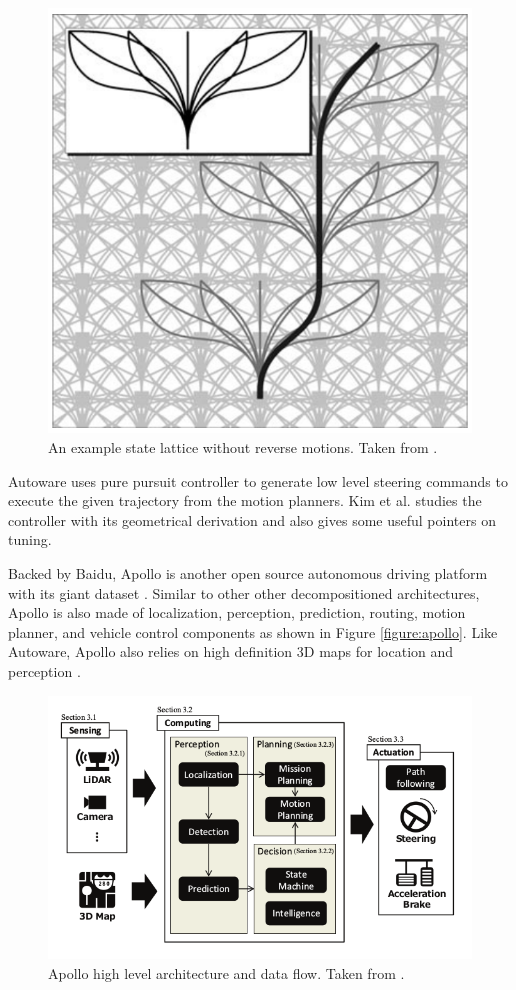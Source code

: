 \begin{figure}[h]
\centering
\includegraphics[width=.8\textwidth]{figures/state-lattice.png}
\caption{An example state lattice without reverse motions. Taken from
\cite{Pivtoraiko2009DifferentiallyCM}.}
\label{figure:state-lattice}
\end{figure}

Autoware uses pure pursuit controller to generate low level steering commands
to execute the given trajectory from the motion planners. Kim et al.
\cite{cite18} studies the controller with its geometrical derivation and also
gives some useful pointers on tuning.

Backed by Baidu, Apollo is another open source autonomous driving platform with
its giant dataset \cite{Huang2018TheAD}. Similar to other other decompositioned
architectures, Apollo is also made of localization, perception, prediction,
routing, motion planner, and vehicle control components as shown in Figure
\ref{figure:apollo}. Like Autoware, Apollo also relies on high definition 3D
maps for location and perception \cite{Fan2018BaiduAE}.

\begin{figure}[h]
\centering
\includegraphics[width=.8\textwidth]{figures/autoware.png}
\caption{Apollo high level architecture and data flow. Taken from
    \cite{Fan2018BaiduAE}.}
\label{figure:autoware}
\end{figure}

